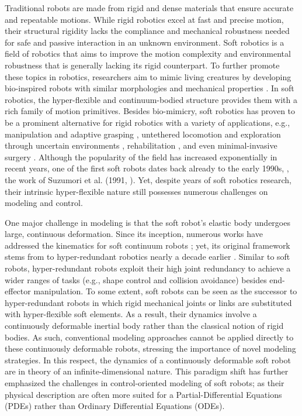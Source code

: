 Traditional robots are made from rigid and dense materials that ensure accurate and repeatable motions. While rigid robotics excel at fast and precise motion, their structural rigidity lacks the compliance and mechanical robustness needed for safe and passive interaction in an unknown environment. Soft robotics is a field of robotics that aims to improve the motion complexity and environmental robustness that is generally lacking its rigid counterpart. To further promote these topics in robotics, researchers aim to mimic living creatures by developing bio-inspired robots with similar morphologies and mechanical properties \cite{Falkenhahn2015,Suzumori1991,Godage2015,Godage2016,Marchese2014,Kriegman2019}.
In soft robotics, the hyper-flexible and continuum-bodied structure provides them with a rich family of motion primitives. Besides bio-mimicry, soft robotics has proven to be a prominent alternative for rigid robotics with a variety of applications, e.g., manipulation and adaptive grasping \cite{Galloway2016}, untethered locomotion and exploration through uncertain environments \cite{Marchese2014,Choi2011,Pilz2020}, rehabilitation \cite{Polygerinos2015}, and even minimal-invasive surgery \cite{Li2017a,Cianchetti2014}. Although the popularity of the field has increased exponentially in recent years, one of the first soft robots dates back already to the early 1990s, \eg, the work of Suzumori et al. (1991, \cite{Suzumori1991}). Yet, despite years of soft robotics research, their intrinsic hyper-flexible nature still possesses numerous challenges on modeling and control.

One major challenge in modeling is that the soft robot's elastic body undergoes large, continuous deformation. Since its inception, numerous works have addressed the kinematics for soft continuum robots \cite{Jones2006,Mochiyama1999,Mochiyama2003}; yet, its original framework stems from to hyper-redundant robotics nearly a decade earlier \cite{Chirikjian1994}. Similar to soft robots, hyper-redundant robots exploit their high joint redundancy to achieve a wider ranges of tasks (e.g., shape control and collision avoidance) besides end-effector manipulation. To some extent, soft robots can be seen as the successor to hyper-redundant robots in which rigid mechanical joints or links are substituted with hyper-flexible soft elements. As a result, their dynamics involve a continuously deformable inertial body rather than the classical notion of rigid bodies. As such, conventional modeling approaches cannot be applied directly to these continuously deformable robots, stressing the importance of novel modeling strategies. In this respect, the dynamics of a continuously deformable soft robot are in theory of an infinite-dimensional nature. This paradigm shift has further emphasized the challenges in control-oriented modeling of soft robots; as their physical description are often more suited for a Partial-Differential Equations (PDEs) rather than Ordinary Differential Equations (ODEs).


